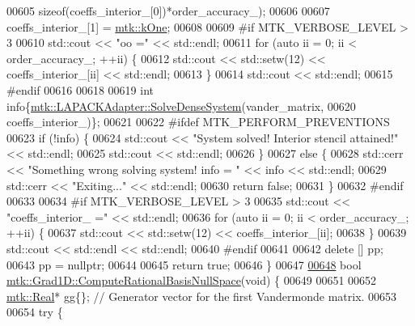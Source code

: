 \begin{DoxyCode}
{{00605 \textcolor{keyword}{sizeof}(coeffs\_interior\_[0])*order\_accuracy\_);
00606 
00607   coeffs\_interior\_[1] = \hyperlink{group__c01-roots_ga26407c24d43b6b95480943340d285c71}{mtk::kOne};
00608 
00609 \textcolor{preprocessor}{  #if MTK\_VERBOSE\_LEVEL > 3}
00610   std::cout << \textcolor{stringliteral}{"oo ="} << std::endl;
00611   \textcolor{keywordflow}{for} (\textcolor{keyword}{auto} ii = 0; ii < order\_accuracy\_; ++ii) \{
00612     std::cout << std::setw(12) << coeffs\_interior\_[ii] << std::endl;
00613   \}
00614   std::cout << std::endl;
00615 \textcolor{preprocessor}{  #endif}
00616 
00618 
00619   \textcolor{keywordtype}{int} info\{\hyperlink{classmtk_1_1LAPACKAdapter_a7428bccf74fd4a4af68fb7233846da22}{mtk::LAPACKAdapter::SolveDenseSystem}(vander\_matrix,
00620                                                 coeffs\_interior\_)\};
00621 
00622 \textcolor{preprocessor}{  #ifdef MTK\_PERFORM\_PREVENTIONS}
00623   \textcolor{keywordflow}{if} (!info) \{
00624     std::cout << \textcolor{stringliteral}{"System solved! Interior stencil attained!"} << std::endl;
00625     std::cout << std::endl;
00626   \}
00627   \textcolor{keywordflow}{else} \{
00628     std::cerr << \textcolor{stringliteral}{"Something wrong solving system! info = "} << info << std::endl;
00629     std::cerr << \textcolor{stringliteral}{"Exiting..."} << std::endl;
00630     \textcolor{keywordflow}{return} \textcolor{keyword}{false};
00631   \}
00632 \textcolor{preprocessor}{  #endif}
00633 
00634 \textcolor{preprocessor}{  #if MTK\_VERBOSE\_LEVEL > 3}
00635   std::cout << \textcolor{stringliteral}{"coeffs\_interior\_ ="} << std::endl;
00636   \textcolor{keywordflow}{for} (\textcolor{keyword}{auto} ii = 0; ii < order\_accuracy\_; ++ii) \{
00637     std::cout << std::setw(12) << coeffs\_interior\_[ii];
00638   \}
00639   std::cout << std::endl << std::endl;
00640 \textcolor{preprocessor}{  #endif}
00641 
00642   \textcolor{keyword}{delete} [] pp;
00643   pp = \textcolor{keyword}{nullptr};
00644 
00645   \textcolor{keywordflow}{return} \textcolor{keyword}{true};
00646 \}
00647 
\hypertarget{mtk__grad__1d_8cc_source_l00648}{}\hyperlink{classmtk_1_1Grad1D_a2d03e6a3961bee558f575ec4099782a9}{00648} \textcolor{keywordtype}{bool} \hyperlink{classmtk_1_1Grad1D_a2d03e6a3961bee558f575ec4099782a9}{mtk::Grad1D::ComputeRationalBasisNullSpace}(\textcolor{keywordtype}{void}) \{
00649 
00651 
00652   \hyperlink{group__c01-roots_gac080bbbf5cbb5502c9f00405f894857d}{mtk::Real}* gg\{\}; \textcolor{comment}{// Generator vector for the first Vandermonde matrix.}
00653 
00654   \textcolor{keywordflow}{try} \{
}}
\end{DoxyCode}
